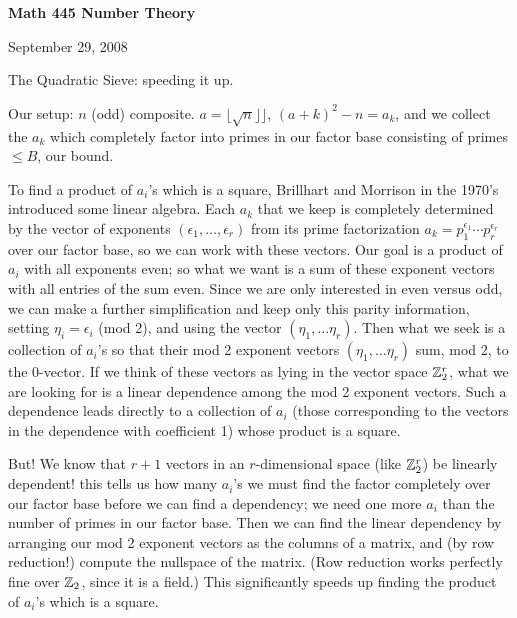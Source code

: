 





\loadmsbm

\nopagenumbers
\overfullrule=0pt


\def\ctln{\centerline}
\def\u{\underbar}
\def\ssk{\smallskip}
\def\msk{\medskip}
\def\bsk{\bigskip}
\def\dl{\displaystyle}
\def\ni{\noindent}
\def\ep{\epsilon}


\ctln{\bf Math 445 Number Theory}

\medskip

\ctln{September 29, 2008}

\bigskip

The Quadratic Sieve: speeding it up.

\ssk

Our setup: $n$ (odd) composite. $a=\lfloor\sqrt{n}\rfloor\rfloor$, $(a+k)^2-n=a_k$, and we collect the $a_k$ which completely
factor into primes in our factor base consisting of primes $\leq B$, our bound.

\ssk

To find a product of $a_i$'s which is a square, Brillhart and Morrison in the 1970's introduced some
linear algebra.
Each $a_k$ that we keep is completely determined by the vector of exponents $(\ep_1,\ldots,\ep_r)$ from its prime
factorization $a_k=p_1^{\ep_1}\cdots p_r^{\ep_r}$ over our factor base, so we can work with these vectors.
Our goal is a product of $a_i$ with all exponents even; so what we want is a sum of these
exponent vectors with all entries of the sum even. Since we are only interested in even versus odd, we can make a further
simplification and keep only this parity information, setting $\eta_i=\ep_i$ (mod 2), and using the
vector $(\eta_1,\ldots \eta_r)$. Then what we seek is a collection of $a_i$'s so that their mod 2 exponent vectors
$(\eta_1,\ldots \eta_r)$ sum, mod 2, to the 0-vector. If we think of these vectors as lying in the vector space
${\Bbb Z}_2^r$, what we are looking for is a linear dependence among the mod 2 exponent vectors. Such a dependence
leads directly to a collection of $a_i$ (those corresponding to the vectors in the dependence with coefficient 1)
whose product is a square. 

\ssk

But! We know that $r+1$ vectors in an $r$-dimensional space (like ${\Bbb Z}_2^r$)  be linearly dependent!
this tells us how many $a_i$'s we must find the factor completely over our factor base before we can find a
dependency; we need one more $a_i$ than the number of primes in our factor base. Then we can find the
linear dependency by arranging our mod 2 exponent vectors as the columns of a matrix, and (by row reduction!)
compute the nullspace of the matrix. (Row reduction works perfectly fine over ${\Bbb Z}_2$, since it is a field.)
This significantly speeds up finding the product of $a_i$'s which is a square.

